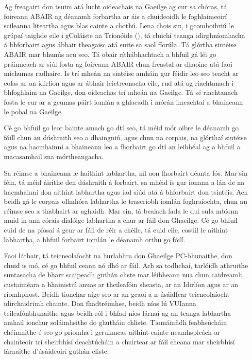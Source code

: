 \begin{multicols}{2}
Ag freagairt don tsuim atá lucht oideachais na Gaeilge ag cur sa chóras, tá foireann ABAIR ag déanamh forbartha ar áis a chuideoidh le foghlaimeoirí scileanna liteartha agus blas cainte a chothú. Lena chois sin, i gcomhoibriú le grúpaí taighde eile i gColáiste na Tríonóide (\cite {slate2011}), tá cluichí teanga idirghníomhacha á bhforbairt agus ábhair theagaisc atá suite sa saol fíorúla. Tá glórtha sintéise ABAIR mar bhunús acu seo. Tá obair ríthábhachtach a bhfuil gá léi go práinneach ar siúl fosta ag foireann ABAIR chun freastal ar dhaoine atá faoi míchumas radhairc. Is trí mheán na sintéise amháin gur féidir leo seo teacht ar eolas ar an idirlíon agus ar ábhair leictreonacha eile, rud atá ag riachtanach i bhfoghlaim na Gaeilge, don oideachas trí mheán na Gaeilge. Tá sé riachtanach fosta le cur ar a gcumas páirt iomlán a ghlacadh i mórán imeachtaí a bhaineann le pobal na Gaeilge.

Cé go bhfuil go leor bainte amach go dtí seo, tá méid mór oibre le déanamh go fóill chun an dúshraith seo a dhaingniú, agus chun na corpais, na glórthaí sintéise agus na hacmhainní a bhaineann leo a fhorbairt go dtí an leibhéal ag a bhfuil a macasamhail sna mórtheangacha.     

Sa réimse a bhaineann le haithint labhartha, níl aon fhorbairt déanta fós. Mar sin féin, tá méid áirithe den dúshraith á forbairt, sa mhéid is gur ionann a lán de na hacmhainní don aithint labhartha agus iad siúd atá á bhforbairt don tsintéis. Ach beidh gá le corpais ollmhóra labhartha le trascríobh iomlán foghraíochta, chun an réimse seo a thabhairt ar aghaidh. Mar sin, tá bealach fada le dul sula mbíonn muid in ann córais dialóige labhartha a chur ar fáil don Ghaeilge. Cé go bhfuil cuid de na píosaí á gcur ar fáil de réir a chéile, tá cuid eile, cosúil le aithint labhartha, a bhfuil forbairt iomlán le déanamh orthu go fóill.


Faoi láthair, tá teicneolaíocht na hurlabhra don Ghaeilge PC-bhunaithe, don chuid is mó, cé go bhfuil ceann nó dhó ar fáil. Ach sa todhchaí, tarlóidh athruithe suntasacha de bharr scaipeadh guthán cliste mar léibheann nua chun caidreamh custaiméara a bhainistiú anuas ar theileafóin sheasta, ar an Idirlíon agus ar an ríomhphost. Beidh tionchar aige seo ar an gcaoi a n-úsáidfear teicneolaíocht idirchaidrimh chainte. Don fhadtréimhse, beidh níos lú VUIanna teileafónbhunaithe agus beidh ról i bhfad níos lárnaí ag an teanga labhartha amhail ionchur soláimhsithe do ghutháin chliste. Tiomáinfidh feabhsúcháin chéimnithe é seo go príomha i gcruinneas aithint cainte neamhspleách ar chainteoir trí sheirbhísí deachtúcháin a chuirtear ar fáil cheana mar sheirbhísí lárnaithe d’úsáideoirí guthán cliste.



\end{multicols}
